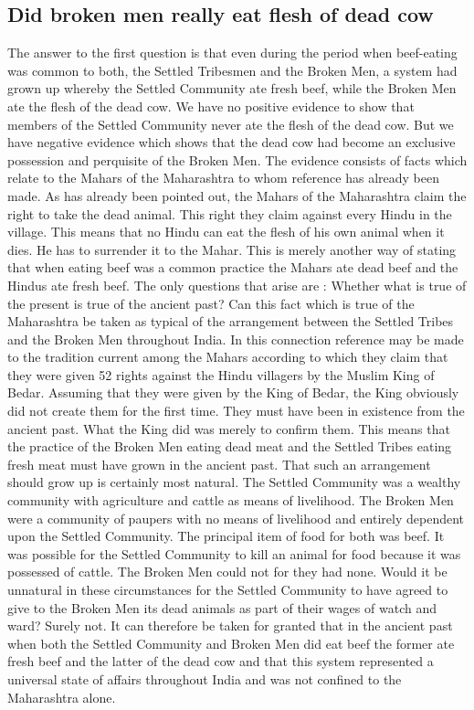 \documentclass{article}
\begin{document}
\subsection{Did broken men really eat flesh of dead cow}
\begin{shadequote}
The answer to the first question is that even during the period when beef-eating was common to both, the Settled Tribesmen and the Broken Men, a system had grown up whereby the Settled Community ate fresh beef, while the Broken Men ate the flesh of the dead cow. We have no positive evidence to show that members of the Settled Community never ate the flesh of the dead cow. But we have negative evidence which shows that the dead cow had become an exclusive possession and perquisite of the Broken Men. The evidence consists of facts which relate to the Mahars of the Maharashtra to whom reference has already been made. As has already been pointed out, the Mahars of the Maharashtra claim the right to take the dead animal. This right they claim against every Hindu in the village. This means that no Hindu can eat the flesh of his own animal when it dies. He has to surrender it to the Mahar. This is merely another way of stating that when eating beef was a common practice the Mahars ate dead beef and the Hindus ate fresh beef. The only questions that arise are : Whether what is true of the present is true of the ancient past? Can this fact which is true of the Maharashtra be taken as typical of the arrangement between the Settled Tribes and the Broken Men throughout India.
In this connection reference may be made to the tradition current among the Mahars according to which they claim that they were given 52 rights against the Hindu villagers by the Muslim King of Bedar. Assuming that they were given by the King of Bedar, the King obviously did not create them for the first time. They must have been in existence from the ancient past. What the King did was merely to confirm them. This means that the practice of the Broken Men eating dead meat and the Settled Tribes eating fresh meat must have grown in the ancient past. That such an arrangement should grow up is certainly most natural. The Settled Community was a wealthy community with agriculture and cattle as means of livelihood. The Broken Men were a community of paupers with no means of livelihood and entirely dependent upon the Settled Community. The principal item of food for both was beef. It was possible for the Settled Community to kill an animal for food because it was possessed of cattle. The Broken Men could not for they had none. Would it be unnatural in these circumstances for the Settled Community to have agreed to give to the Broken Men its dead animals as part of their wages of watch and ward? Surely not. It can therefore be taken for granted that in the ancient past when both the Settled Community and Broken Men did eat beef the former ate fresh beef and the latter of the dead cow and that this system represented a universal state of affairs throughout India and was not confined to the Maharashtra alone.
\end{shadequote}
\end{document}
